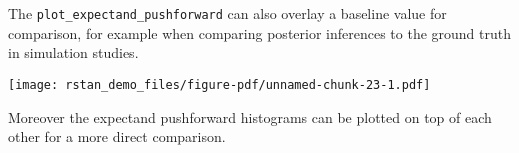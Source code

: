\documentclass[
  letterpaper,
  DIV=11,
  numbers=noendperiod]{scrartcl}
\newenvironment{Shaded}{\begin{snugshade}}{\end{snugshade}}
\newcommand{\AttributeTok}[1]{\textcolor[rgb]{0.40,0.45,0.13}{#1}}
\newcommand{\DecValTok}[1]{\textcolor[rgb]{0.68,0.00,0.00}{#1}}
\newcommand{\FloatTok}[1]{\textcolor[rgb]{0.68,0.00,0.00}{#1}}
\newcommand{\FunctionTok}[1]{\textcolor[rgb]{0.28,0.35,0.67}{#1}}
\newcommand{\NormalTok}[1]{\textcolor[rgb]{0.00,0.23,0.31}{#1}}
\newcommand{\SpecialCharTok}[1]{\textcolor[rgb]{0.37,0.37,0.37}{#1}}
\newcommand{\StringTok}[1]{\textcolor[rgb]{0.13,0.47,0.30}{#1}}
\begin{document}
The \texttt{plot\_expectand\_pushforward} can also overlay a baseline
value for comparison, for example when comparing posterior inferences to
the ground truth in simulation studies.

\begin{Shaded}
\end{Shaded}

\texttt{[image: rstan\_demo\_files/figure-pdf/unnamed-chunk-23-1.pdf]}

Moreover the expectand pushforward histograms can be plotted on top of
each other for a more direct comparison.
\end{document}
